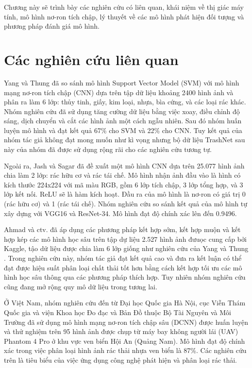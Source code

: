 \documentclass[../the.tex]{subfiles}
\begin{document}
{\fontsize{13}{12} \selectfont
Chương này sẽ trình bày các nghiên cứu có liên quan, khái niệm về thị giác máy tính, mô hình nơ-ron tích chập, lý thuyết về các mô hình phát hiện đối tượng và phương pháp đánh giá mô hình.
}

\section{Các nghiên cứu liên quan}
\label{sec:nnlq}
{\fontsize{13}{12} \selectfont
	Yang và Thung \cite{yang2016classification} đã so sánh mô hình Support Vector Model (SVM) với
	mô hình mạng nơ-ron tích chập (CNN) dựa trên tập dữ liệu khoảng 2400 hình
	ảnh và phân ra làm 6 lớp: thủy tinh, giấy, kim loại, nhựa, bìa cứng, và các loại
	rác khác. Nhóm nghiên cứu đã sử dụng tăng cường dữ liệu bằng việc xoay, điều chỉnh độ sáng,
	dịch chuyển và cắt các hình ảnh một cách ngẫu nhiên. Sau đó nhóm huấn luyện mô hình và đạt kết quả 67\% cho SVM và 22\% cho CNN.
	Tuy kết quả của nhóm tác giả không đạt mong muốn như kì vọng nhưng bộ dữ liệu TrashNet sau này của nhóm đã được sử dụng rộng rãi cho các nghiên cứu tương tự.

	Ngoài ra, Jash và Sagar \cite{shah2022method} đã đề xuất một mô hình CNN dựa trên 25.077
	hình ảnh chia làm 2 lớp: rác hữu cơ và rác tái chế. Mô hình nhận ảnh đầu vào là
	hình có kích thước 224x224 với mã màu RGB, gồm 6 lớp tích chập, 3 lớp tổng
	hợp, và 3 lớp kết nối. ReLU sẽ là hàm kích hoạt. Đầu ra của mô hình là nơ-ron
	có giá trị 0 (rác hữu cơ) và 1 (rác tái chế). Nhóm nghiên cứu so sánh kết quả
	của mô hình tự xây dựng với VGG16 \cite{simonyan2014very} và ResNet-34.
	Mô hình đạt độ chính xác lên đến 0.9496.

	Ahmad và ctv. \cite{ahmad2020intelligent} đã áp dụng các phương pháp kết hợp sớm, kết hợp muộn
	và kết hợp kép các mô hình học sâu trên tập dự liệu 2.527 hình ảnh đưuọc cung cấp bởi Kaggle, tậo dữ liệu
	được chia làm 6 lớp giống như nghiên cứu của Yang và Thung \cite{yang2016classification}. Trong nghiên cứu này,
	nhóm tác giả đạt kết quả cao và đưa ra kết luận có thể đạt được hiệu suất phân
	loại chất thải tốt hơn bằng cách kết hợp tối ưu các mô hình học sâu thông qua
	các phương pháp thích hợp. Tuy nhiên nhóm nghiên cứu cũng đang mở rộng
	quy mô dữ liệu trong tương lai.

	Ở Việt Nam, nhóm nghiên cứu đến từ Đại học Quốc gia Hà Nội, cục Viễn
	Thám Quốc gia và viện Khoa học Đo đạc và Bản Đồ thuộc Bộ Tài Nguyên và
	Môi Trường \cite{nhung2021nghien} đã sử dụng mô hình mạng nơ-ron tích chập sâu (DCNN) được
	huấn luyện và thử nghiệm trên 95 hình ảnh được chụp từ máy bay không người
	lái (UAV) Phantom 4 Pro ở khu vực ven biển Hội An (Quảng Nam). Mô hình
	đạt độ chính xác trong việc phân loại hình ảnh rác thải nhựa ven biển là 87\%.
	Các nghiên cứu trên là tiêu biểu của việc ứng dụng công nghệ phát hiện
	và phân loại rác thải.

}
\end{document}
